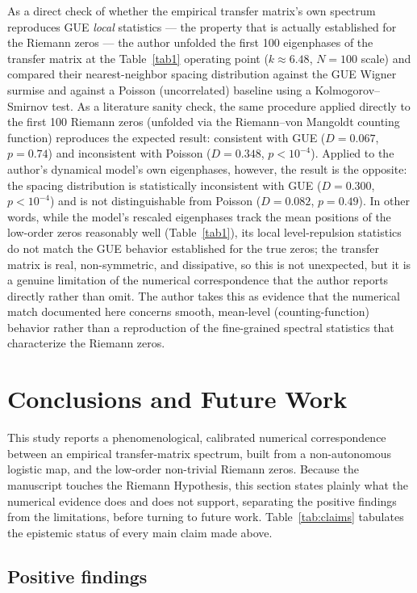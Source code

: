 \documentclass[mca,article,submit,oneauthor,pdftex]{Definitions/mdpi}
\begin{document}
As a direct check of whether the empirical transfer matrix's own
spectrum reproduces GUE \emph{local} statistics --- the property that is
actually established for the Riemann zeros --- the author unfolded the first 100
eigenphases of the transfer matrix at the Table~\ref{tab1} operating
point (\(k\approx6.48\), \(N=100\) scale) and compared their nearest-neighbor
spacing distribution against the GUE Wigner surmise and against a
Poisson (uncorrelated) baseline using a Kolmogorov--Smirnov test. As a
literature sanity check, the same procedure applied directly to the first
100 Riemann zeros (unfolded via the Riemann--von Mangoldt counting
function) reproduces the expected result: consistent with GUE
(\(D=0.067\), \(p=0.74\)) and inconsistent with Poisson
(\(D=0.348\), \(p<10^{-4}\)). Applied to the author's dynamical model's own
eigenphases, however, the result is the opposite: the spacing
distribution is statistically inconsistent with GUE (\(D=0.300\),
\(p<10^{-4}\)) and is not distinguishable from Poisson (\(D=0.082\),
\(p=0.49\)). In other words, while the model's rescaled eigenphases
track the mean positions of the low-order zeros reasonably well (Table~\ref{tab1}),
its local level-repulsion statistics do not match the GUE behavior
established for the true zeros; the transfer matrix is real,
non-symmetric, and dissipative, so this is not unexpected, but it is a
genuine limitation of the numerical correspondence that the author reports
directly rather than omit. The author takes this as evidence that the numerical
match documented here concerns smooth, mean-level (counting-function)
behavior rather than a reproduction of the fine-grained spectral
statistics that characterize the Riemann zeros.

\section{Conclusions and Future Work}\label{sec:conclusions}

This study reports a phenomenological, calibrated numerical correspondence
between an empirical transfer-matrix spectrum, built from a non-autonomous
logistic map, and the low-order non-trivial Riemann zeros. Because the
manuscript touches the Riemann Hypothesis, this section states plainly what
the numerical evidence does and does not support, separating the positive
findings from the limitations, before turning to future work.
Table~\ref{tab:claims} tabulates the epistemic status of every main claim
made above.

\subsection{Positive findings}
\end{document}
